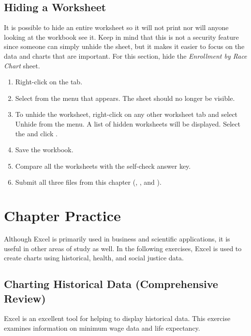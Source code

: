 \subsection{Hiding a Worksheet}

It is possible to hide an entire worksheet so it will not print nor will anyone looking at the workbook see it. Keep in mind that this is not a security feature since someone can simply unhide the sheet, but it makes it easier to focus on the data and charts that are important. For this section, hide the \textit{Enrollment by Race Chart} sheet.

\begin{enumerate}
	\item Right-click on the  tab.
	\item Select  from the menu that appears. The  sheet should no longer be visible.
	\item To unhide the worksheet, right-click on any other worksheet tab and select Unhide from the menu. A list of hidden worksheets will be displayed. Select the  and click .
	\item Save the  workbook.
	\item Compare all the worksheets with the self-check answer key.
	\item Submit all three files from this chapter (, , and ).
\end{enumerate}

\section{Chapter Practice}

Although Excel is primarily used in business and scientific applications, it is useful in other areas of study as well. In the following exercises, Excel is used to create charts using historical, health, and social justice data.

\subsection{Charting Historical Data (Comprehensive Review)}

Excel is an excellent tool for helping to display historical data. This exercise examines information on minimum wage data and life expectancy.

